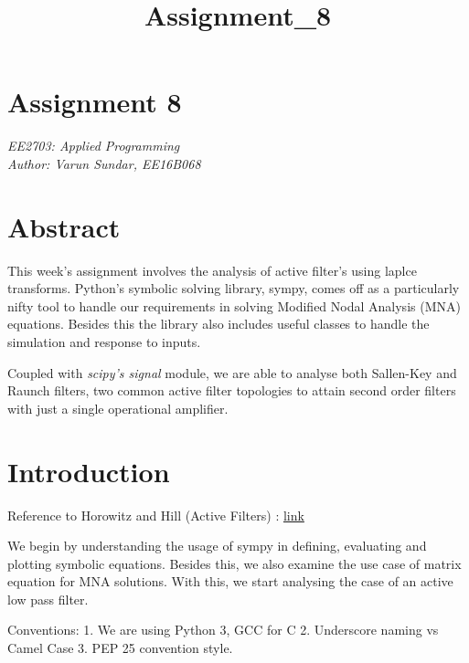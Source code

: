 \documentclass[11pt]{article}
\title{Assignment\_8}
\begin{document}
    
    
    \maketitle
    
    

    
    \hypertarget{assignment-8}{%
\section{Assignment 8}\label{assignment-8}}

\emph{EE2703: Applied Programming\\
Author: Varun Sundar, EE16B068}

\hypertarget{abstract}{%
\section{Abstract}\label{abstract}}

This week's assignment involves the analysis of active filter's using
laplce transforms. Python's symbolic solving library, sympy, comes off
as a particularly nifty tool to handle our requirements in solving
Modified Nodal Analysis (MNA) equations. Besides this the library also
includes useful classes to handle the simulation and response to inputs.

Coupled with \emph{scipy's signal} module, we are able to analyse both
Sallen-Key and Raunch filters, two common active filter topologies to
attain second order filters with just a single operational amplifier.

\hypertarget{introduction}{%
\section{Introduction}\label{introduction}}

Reference to Horowitz and Hill (Active Filters) :
\href{https://artofelectronics.net/}{link}

We begin by understanding the usage of sympy in defining, evaluating and
plotting symbolic equations. Besides this, we also examine the use case
of matrix equation for MNA solutions. With this, we start analysing the
case of an active low pass filter.

Conventions: 1. We are using Python 3, GCC for C 2. Underscore naming vs
Camel Case 3. PEP 25 convention style.
\end{document}
